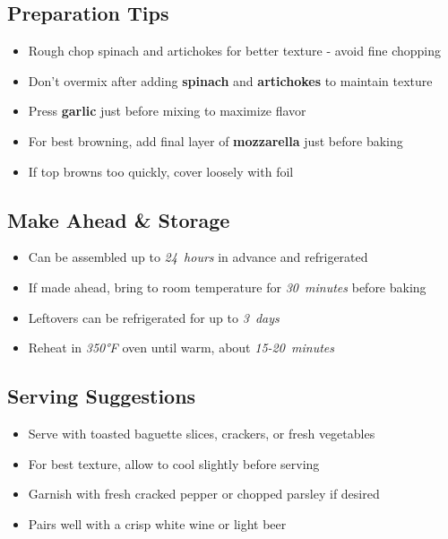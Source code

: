 \documentclass[11pt,letterpaper]{article}
\begin{document}
{\begin{multicols}{2}
\subsection*{Preparation Tips}
\begin{itemize}
    \item Rough chop spinach and artichokes for better texture - avoid fine chopping
    \item Don't overmix after adding \textbf{spinach} and \textbf{artichokes} to maintain texture
    \item Press \textbf{garlic} just before mixing to maximize flavor
    \item For best browning, add final layer of \textbf{mozzarella} just before baking
    \item If top browns too quickly, cover loosely with foil
\end{itemize}

\subsection*{Make Ahead \& Storage}
\begin{itemize}
    \item Can be assembled up to \textit{24~hours} in advance and refrigerated
    \item If made ahead, bring to room temperature for \textit{30~minutes} before baking
    \item Leftovers can be refrigerated for up to \textit{3~days}
    \item Reheat in \textit{350°F} oven until warm, about \textit{15-20~minutes}
\end{itemize}

\subsection*{Serving Suggestions}
\begin{itemize}
    \item Serve with toasted baguette slices, crackers, or fresh vegetables
    \item For best texture, allow to cool slightly before serving
    \item Garnish with fresh cracked pepper or chopped parsley if desired
    \item Pairs well with a crisp white wine or light beer
\end{itemize}

\end{multicols}
}
\end{document}
